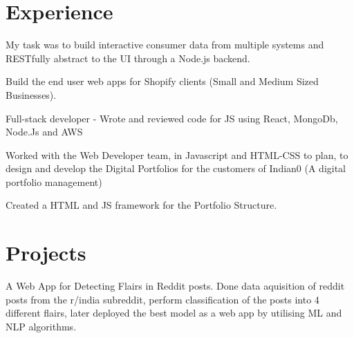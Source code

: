 \documentclass[]{deedy-resume-openfont}
\begin{document}
\begin{minipage}[t]{0.66\textwidth} 


\section{Experience}
\vspace{\topsep} %
\begin{tightemize}
\item My task was to build interactive consumer data from multiple systems and RESTfully abstract to the UI through a Node.js backend.
\item Build the end user web apps for Shopify clients (Small and Medium Sized Businesses). 
\item Full-stack developer - Wrote and reviewed code for JS using React, MongoDb, Node.Js and AWS 
\end{tightemize}
\sectionsep

\begin{tightemize}
\item Worked with the Web Developer team, in Javascript and HTML-CSS to plan, to design and develop the Digital Portfolios for the customers of Indian0 (A digital portfolio management)
\item Created a HTML and JS framework for the Portfolio Structure.
\end{tightemize}
\sectionsep


\section{Projects}
A Web App for Detecting Flairs in Reddit posts. Done data aquisition of reddit posts from the r/india subreddit, perform classification of the posts into 4 different flairs, later deployed the best model as a web app by utilising ML and NLP algorithms.
\sectionsep


\end{minipage}
\end{document}
